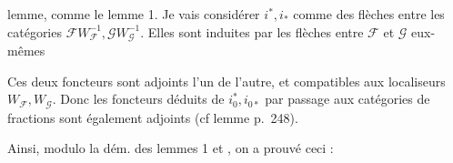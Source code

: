 lemme,  comme le lemme 1. Je vais considérer $i^*,i_*$ comme des flèches entre les catégories $\mathscr F W_{\mathscr F}^{-1},\mathscr G W_{\mathscr G}^{-1}$. Elles sont induites par les flèches
entre $\mathscr F$ et $\mathscr G$ eux-mêmes

Ces deux foncteurs sont adjoints l'un de l'autre, et compatibles aux localiseurs $W_{\mathscr F},W_{\mathscr G}$. Donc les foncteurs  déduits de $i_0^*,i_{0*}$ par passage aux catégories de fractions sont également adjoints (cf lemme p.~248).

Ainsi, modulo la dém. des lemmes 1 et , on a prouvé ceci :
